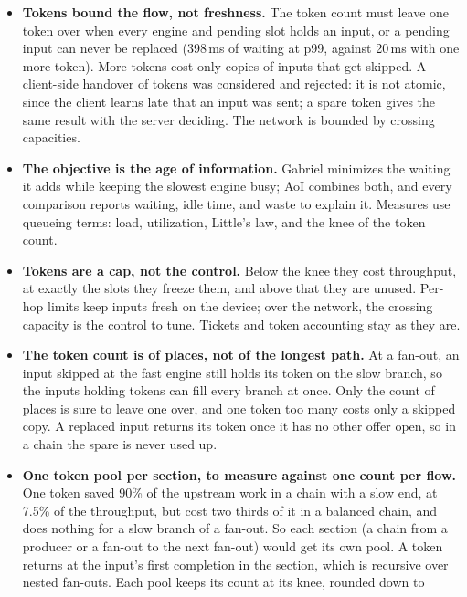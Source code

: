 \documentclass[11pt]{article}
\newcommand{\code}[1]{\texttt{#1}}
\begin{document}
\begin{itemize}[nosep]
        (\code{docs/evaluation.tex}).
  \item \textbf{Tokens bound the flow, not freshness.} The token count must
        leave one token over when every engine and pending slot holds an
        input, or a pending input can never be replaced (398\,ms of waiting
        at p99, against 20\,ms with one more token). More tokens cost only copies of
        inputs that get skipped. A client-side handover of tokens was
        considered and rejected: it is not atomic, since the client learns
        late that an input was sent; a spare token gives the same result with
        the server deciding. The network is bounded by crossing capacities.
  \item \textbf{The objective is the age of information.} Gabriel minimizes
        the waiting it adds while keeping the slowest engine busy; AoI
        combines both, and every comparison reports waiting, idle time, and
        waste to explain it. Measures use queueing terms: load, utilization,
        Little's law, and the knee of the token count.
  \item \textbf{Tokens are a cap, not the control.} Below the knee they cost
        throughput, at exactly the slots they freeze them, and above that
        they are unused. Per-hop limits keep inputs fresh on the device; over
        the network, the crossing capacity is the control to tune. Tickets
        and token accounting stay as they are.
  \item \textbf{The token count is of places, not of the longest path.} At a
        fan-out, an input skipped at the fast engine still holds its token
        on the slow branch, so the inputs holding tokens can fill every
        branch at once. Only the count of places is sure to leave one over,
        and one token too many costs only a skipped copy. A replaced input
        returns its token once it has no other offer open, so in a chain
        the spare is never used up.
  \item \textbf{One token pool per section, to measure against one count
        per flow.} One token saved 90\% of the upstream work in a chain with
        a slow end, at 7.5\% of the throughput, but cost two thirds of it in
        a balanced chain, and does nothing for a slow branch of a fan-out.
        So each section (a chain from a producer or a fan-out to the next
        fan-out) would get its own pool. A token returns at the input's
        first completion in the section, which is recursive over nested
        fan-outs. Each pool keeps its count at its knee, rounded down to

\end{itemize}
\end{document}
